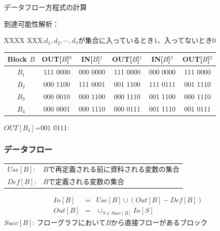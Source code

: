 \documentclass[dvipdfmx]{beamer}
\begin{document}
\begin{frame}{データフロー方程式の計算}

  到達可能性解析：

  {\small
    {XXXX XXX}:$d_1,d_2,\cdots,d_7$が集合に入っているとき$1$、入ってないとき$0$
  }

  \vspace*{10pt}

  {\footnotesize
    \begin{tabular}{c|c|c|c|c|c}\hline
      Block $B$ & OUT[$B$]$^0$ & IN[$B$]$^1$ & OUT[$B$]$^1$ & IN[$B$]$^2$ & OUT[$B$]$^2$ \\\hline
      $B_1$     & 111 0000     & 000 0000    & 111 0000     & 000 0000    & 111 0000     \\
      $B_2$     & 000 1100     & 111 0001    & 001 1100     & 111 0111    & 001 1110     \\
      $B_3$     & 000 0010     & 000 1100    & 000 1110     & 001 1100    & 000 1110     \\
      $B_4$     & 000 0001     & 000 1110    & 000 0111     & 001 1110    & 001 0111     \\\hline
    \end{tabular}
  }

  \vspace*{10pt}



  $OUT[B_4]$=001 0111:\\

\end{frame}

\begin{frame}
  \frametitle{データフロー}
  \begin{tabular}{ll}
    $Use[B]$: & $B$で再定義される前に資料される変数の集合 \\
    $Def[B]$: & $B$で定義される変数の集合
  \end{tabular}

  \begin{eqnarray*}
    In[B] & = & Use[B]\cup(Out[B]-Def[B])\\
    Out[B] & = & \cup_{S\in Succ[B]}In[S]
  \end{eqnarray*}
  $Succ[B]$: フローグラフにおいて$B$から直接フローがあるブロック

  \vspace*{10pt}

\end{frame}
\end{document}

